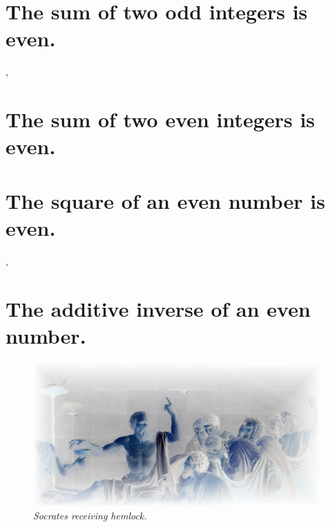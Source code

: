 \documentclass[preview]{standalone}
\begin{document}
\section{The sum of two odd integers is even.}

\sep


\section{The sum of two even integers is even.}

\pagebreak


\section{The square of an even number is even.}

\sep


\section{The additive inverse of an even number.}

\begin{figure}[h!]
    \centering
    \includegraphics[width=11cm]{../resources/jpg/1.6.introduction.to.proofs/socrates.jpg}
    \caption*{\emph{Socrates receiving hemlock.}}
\end{figure}    
\pagebreak


\end{document}
